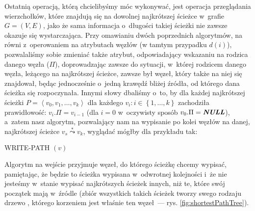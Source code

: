 Ostatnią operacją, którą chcielibyśmy móc wykonywać, jest operacja przeglądania wierzchołków, które znajdują się na dowolnej najkrótszej ścieżce w~grafie $G = \left( V, E \right)$, jako że sama informacja o~długości takiej ścieżki nie zawsze okazuje się wystarczająca. Przy omawianiu dwóch poprzednich algorytmów, na równi z~operowaniem na atrybutach węzłów (w tamtym przypadku $d \left( i \right)$), pozwalaliśmy sobie zmieniać także atrybut, odpowiadający wskazaniu na rodzica danego węzła ($\Pi$), doprowadzając zawsze do sytuacji, w~której rodzicem danego węzła, leżącego na najkrótszej ścieżce, zawsze był węzeł, który także na niej się znajdował, będąc jednocześnie o~jedną krawędź bliżej źródła, od którego dana ścieżka się rozpoczynała. Innymi słowy dbaliśmy o~to, by dla każdej najkrótszej ścieżki $ P = \left \langle v_{0}, v_{1}, \ldots, v_{k} \right \rangle$ dla każdego $v_{i} : i \in \left\{ 1, \ldots, k \right\}$ zachodziła prawidłowość: $v_{i}.\Pi = v_{i-1}$ (dla $i = 0$ w~oczywisty sposób $v_{0}.\Pi = \emph{\textbf{NULL}}$), a~zatem nasz algorytm, pozwalający nam na wypisanie po kolei węzłów na danej, najkrótszej ścieżce $v_{s} \overset{*} \leadsto v_{k}$, wyglądać mógłby dla przykładu tak:

\begin{pseudokod}[!htbp]
\DontPrintSemicolon
{}
\caption{WRITE-PATH $\left( v \right)$ \label{alg:writePAth}}
\end{pseudokod}

Algorytm na wejście przyjmuje węzeł, do którego ścieżkę chcemy wypisać, pamiętając, że będzie to ścieżka wypisana w~odwrotnej kolejności i~że nie jesteśmy w~stanie wypisać najkrótszych ścieżek innych, niż te, które swój początek mają w~źródle (zbiór wszystkich takich ścieżek tworzy swego rodzaju drzewo \cite[$24.5$]{Cormen}, którego korzeniem jest właśnie ten węzeł~---  rys. \ref{fig:shortestPathTree}).

